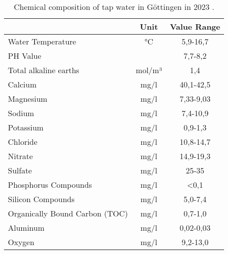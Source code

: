 \begin{table}[H]
    \centering 
    \begin{tabular}{|l|c|c|}
    \hline
                                   & Unit   & \multicolumn{1}{l|}{Value Range} \\ \hline
    Water Temperature              & °C     & 5,9-16,7                                  \\ \hline
    PH Value                       &        & 7,7-8,2                                   \\ \hline
    Total alkaline earths          & mol/m³ & 1,4                                       \\ \hline
    Calcium                        & mg/l   & 40,1-42,5                                 \\ \hline
    Magnesium                      & mg/l   & 7,33-9,03                                 \\ \hline
    Sodium                         & mg/l   & 7,4-10,9                                  \\ \hline
    Potassium                      & mg/l   & 0,9-1,3                                   \\ \hline
    Chloride                       & mg/l   & 10,8-14,7                                 \\ \hline
    Nitrate                        & mg/l   & 14,9-19,3                                 \\ \hline
    Sulfate                        & mg/l   & 25-35                                     \\ \hline
    Phosphorus Compounds           & mg/l   & \textless{}0,1                            \\ \hline
    Silicon Compounds              & mg/l   & 5,0-7,4                                   \\ \hline
    Organically Bound Carbon (TOC) & mg/l   & 0,7-1,0                                   \\ \hline
    Aluminum                       & mg/l   & 0,02-0,03                                 \\ \hline
    Oxygen                         & mg/l   & 9,2-13,0                                  \\ \hline
    \end{tabular}
    \caption{Chemical composition of tap water in Göttingen in 2023 \cite{WasserversorgungGottingenStadtwerke}.}
        \label{table:water_composition}
    \end{table}

